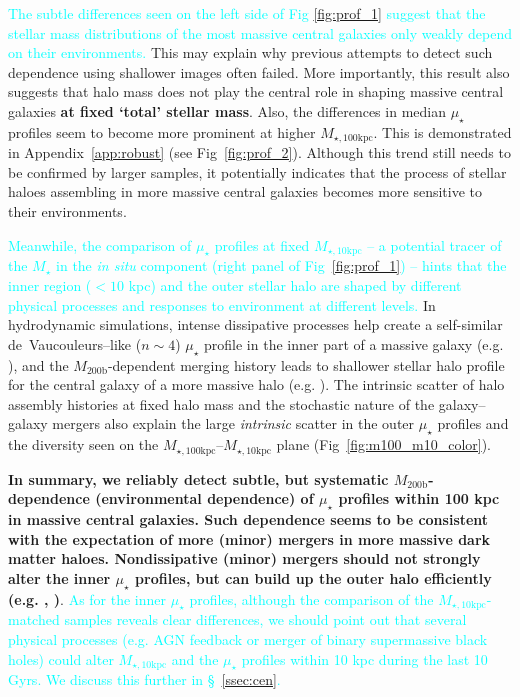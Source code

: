 \documentclass[a4paper,fleqn,usenatbib]{mnras}
\def\mstar{{$M_{\star}$}}
\def\mhalo{{$M_{\mathrm{200b}}$}}
\def\minn{{$M_{\star,10\mathrm{kpc}}$}}
\def\mtot{{$M_{\star,100\mathrm{kpc}}$}}
\def\mden{{$\mu_{\star}$}}
\newcommand{\song}[1]{\textcolor{cyan}{#1}}
\begin{document}
    \song{
    The subtle differences seen on the left side of Fig \ref{fig:prof_1} suggest
    that the stellar mass distributions of the most massive central galaxies only
    weakly depend on their environments. 
    }
    This may explain why previous attempts to detect such dependence using 
    shallower images often failed. 
    More importantly, this result also suggests that halo mass does not play the 
    central role in shaping massive central galaxies \textbf{at fixed `total' 
    stellar mass}.
    Also, the differences in median \mden{} profiles seem to become more prominent 
    at higher \mtot{}. 
    This is demonstrated in Appendix~\ref{app:robust} (see Fig~\ref{fig:prof_2}). 
    Although this trend still needs to be confirmed by larger samples, it 
    potentially indicates that the process of stellar haloes assembling in more 
    massive central galaxies becomes more sensitive to their environments.   
     
    \song{
    Meanwhile, the comparison of \mden{} profiles at fixed \minn{} -- a potential 
    tracer of the \mstar{} in the \textit{in situ} component (right panel of 
    Fig~\ref{fig:prof_1}) -- hints that the inner region ($<10$ kpc) and the outer 
    stellar halo are shaped by different physical processes and responses to 
    environment at different levels. 
    }  
    In hydrodynamic simulations, intense dissipative processes help create 
    a self-similar de~Vaucouleurs--like ($n{\sim} 4$) \mden{} profile in the inner part 
    of a massive galaxy (e.g. \citealt{Hopkins2008}), and the \mhalo{}-dependent
    merging history leads to shallower stellar halo profile for the central galaxy 
    of a more massive halo (e.g. \citealt{Pillepich2014}). 
    The intrinsic scatter of halo assembly histories at fixed halo mass and the 
    stochastic nature of the galaxy--galaxy mergers also explain the large 
    \textit{intrinsic} scatter in the outer \mden{} profiles and the diversity 
    seen on the \mtot{}--\minn{} plane (Fig~\ref{fig:m100_m10_color}).

    \textbf{In summary, we reliably detect subtle, but systematic \mhalo{}-dependence 
    (environmental dependence) of \mden{} profiles within 100 kpc in massive central 
    galaxies. 
    Such dependence seems to be consistent with the expectation of more (minor) 
    mergers in more massive dark matter haloes. 
    Nondissipative (minor) mergers should not strongly alter the inner \mden{} 
    profiles, but can build up the outer halo efficiently
    (e.g. \citealt{Hilz2013}, \citealt{Oogi2013})}.
    \song{
    As for the inner \mden{} profiles, although the comparison of the \minn{}-matched
    samples reveals clear differences, we should point out that several physical 
    processes (e.g. AGN feedback or merger of binary supermassive black holes) could 
    alter \minn{} and the \mden{} profiles within 10 kpc during the last 10 Gyrs. 
    We discuss this further in \S~\ref{ssec:cen}.
    }
      
\end{document}

